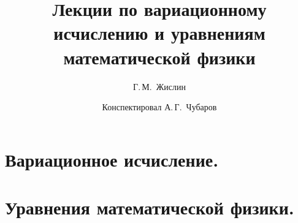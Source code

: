 \documentclass[12pt,a4paper,openany]{book}
\newcommand{\mc}[1]{\ensuremath{\mathcal{#1}}}
\theoremstyle{definition}
\begin{document}
	

	
	
	\author{Г.\,М.~Жислин}
	\title{Лекции по вариационному исчислению и уравнениям математической физики}
	\date{Конспектировал А.\,Г.~Чубаров}
	
	
	
	\maketitle
	\tableofcontents
	
	\renewcommand{\thepart}{\Asbuk{part}}
	\renewcommand{\thechapter}{\arabic{chapter}}
	\renewcommand{\thesection}{\arabic{section}}
	\renewcommand{\thesubsection}{\Roman{subsection}}
	\renewcommand{\thefootnote}{\roman{footnote}}
	\renewcommand{\phi}{\varphi}
	\renewcommand{\Re}{\ensuremath{\mc{R}e\,}}
	\renewcommand{\Im}{\ensuremath{\mc{I}m\,}}
	
	\part{Вариационное исчисление.}
	\label{part1}
	
	
	
	
	
	
	
	
	
	
	\part{Уравнения математической физики.}
	\label{part2}
	
	
	
	
	
	
	
	
	
	
\end{document}
